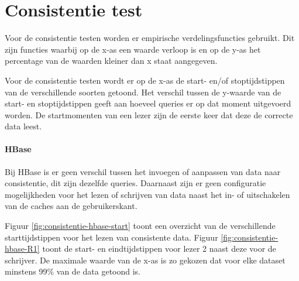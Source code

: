 \section{Consistentie test}
Voor de consistentie testen worden er empirische verdelingsfuncties gebruikt. Dit zijn functies waarbij op de x-as een waarde verloop is en op de y-as het percentage van de waarden kleiner dan x staat aangegeven.

Voor de consistentie testen wordt er op de x-as de start- en/of stoptijdstippen van de verschillende soorten getoond. Het verschil tussen de y-waarde van de start- en stoptijdstippen geeft aan hoeveel queries er op dat moment uitgevoerd worden. De startmomenten van een lezer zijn de eerste keer dat deze de correcte data leest.    

\paragraph{HBase}
Bij HBase is er geen verschil tussen het invoegen of aanpassen van data naar consistentie, dit zijn dezelfde queries. Daarnaast zijn er geen configuratie mogelijkheden voor het lezen of schrijven van data naast het in- of uitschakelen van de caches aan de gebruikerskant. 

Figuur \ref{fig:consistentie-hbase-start} toont een overzicht van de verschillende starttijdstippen voor het lezen van consistente data. Figuur \ref{fig:consistentie-hbase-R1} toont de start- en eindtijdstippen voor lezer 2 naast deze voor de schrijver. De maximale waarde van de x-as is zo gekozen dat voor elke dataset minstens 99\% van de data getoond is. 

